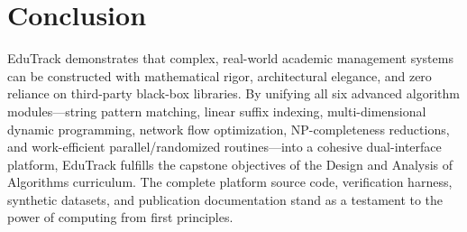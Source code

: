 \section{Conclusion}
EduTrack demonstrates that complex, real-world academic management systems can be constructed with mathematical rigor, architectural elegance, and zero reliance on third-party black-box libraries. By unifying all six advanced algorithm modules—string pattern matching, linear suffix indexing, multi-dimensional dynamic programming, network flow optimization, NP-completeness reductions, and work-efficient parallel/randomized routines—into a cohesive dual-interface platform, EduTrack fulfills the capstone objectives of the Design and Analysis of Algorithms curriculum. The complete platform source code, verification harness, synthetic datasets, and publication documentation stand as a testament to the power of computing from first principles.
